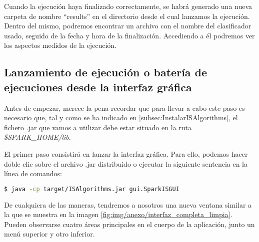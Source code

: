 Cuando la ejecución haya finalizado correctamente, se habrá generado una nueva carpeta de nombre ``results'' en el directorio desde el cual lanzamos la ejecución. Dentro del mismo, podremos encontrar un archivo con el nombre del clasificador usado, seguido de la fecha y hora de la finalización. Accediendo a él podremos ver los aspectos medidos de la ejecución.

\subsection{Lanzamiento de ejecución o batería de ejecuciones desde la interfaz gráfica}\label{subsec:ejecutaGUI}

Antes de empezar, merece la pena recordar que para llevar a cabo este paso es necesario que, tal y como se ha indicado en \ref{subsec:InstalarISAlgorithms}, el fichero .jar que vamos a utilizar debe estar situado en la ruta \textit{\$SPARK\_HOME/lib}.

El primer paso consistirá en lanzar la interfaz gráfica. Para ello, podemos hacer doble clic sobre el archivo .jar distribuido o ejecutar la siguiente sentencia en la línea de comandos:

\begin{lstlisting}[language=bash]
$ java -cp target/ISAlgorithms.jar gui.SparkISGUI
\end{lstlisting}

De cualquiera de las maneras, tendremos a nosotros una nueva ventana similar a la que se muestra en la imagen \ref{fig:img/anexo/interfaz_completa_limpia}. Pueden observarse cuatro áreas principales en el cuerpo de la aplicación, junto un menú superior y otro inferior.


